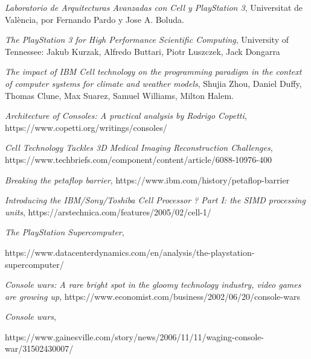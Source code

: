 \documentclass[10pt,compsoc]{IEEEtran}
\begin{document}
	
		\begin{thebibliography}{1}
			
			{\it{Laboratorio de Arquitecturas Avanzadas con Cell y PlayStation 3}}, Universitat de València, por Fernando Pardo y Jose A. Boluda.\newline
			
			{\it{The PlayStation 3 for High Performance Scientific Computing}}, University of Tennessee: Jakub Kurzak, Alfredo Buttari, Piotr Luszczek, Jack Dongarra\newline
			
			{\it{The impact of IBM Cell technology on the programming paradigm in the context of computer systems	for climate and weather	models}}, Shujia Zhou, Daniel Duffy, Thomas Clune, Max Suarez, 	Samuel Williams, Milton Halem.\newline
			
			{\it{Architecture of Consoles: A practical analysis by Rodrigo Copetti}}, 
			https://www.copetti.org/writings/consoles/\newline
			
			{\it{Cell Technology Tackles 3D Medical Imaging Reconstruction Challenges}}, https://www.techbriefs.com/component/content/article/6088-10976-400\newline
			
			{\it{Breaking the petaflop barrier}},
			https://www.ibm.com/history/petaflop-barrier\newline
			
			{\it{Introducing the IBM/Sony/Toshiba Cell Processor ? Part I: the SIMD processing units}},
			https://arstechnica.com/features/2005/02/cell-1/\newline
			
			{\it{The PlayStation Supercomputer}},
			
			 https://www.datacenterdynamics.com/en/analysis/the-playstation-supercomputer/\newline
	
			{\it{Console wars: A rare bright spot in the gloomy technology industry, video games are growing up}}, 
			https://www.economist.com/business/2002/06/20/console-wars\newline
			

			{\it{Console wars}},
					
			https://www.gainesville.com/story/news/2006/11/11/waging-console-war/31502430007/\newline
			

\end{thebibliography}
\end{document}
